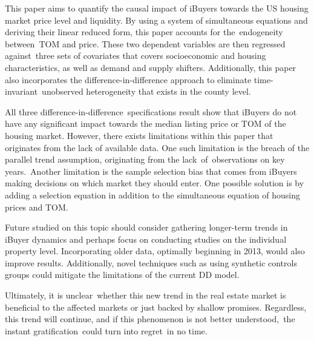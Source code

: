 This paper aims to quantify the causal impact of iBuyers towards the US housing market price level and liquidity. By using a system of simultaneous equations and deriving their linear reduced form, this paper accounts for the endogeneity between TOM and price. These two dependent variables are then regressed against three sets of covariates that covers socioeconomic and housing characteristics, as well as demand and supply shifters. Additionally, this paper also incorporates the difference-in-difference approach to eliminate time-invariant unobserved heterogeneity that exists in the county level.  

All three difference-in-difference specifications result show that iBuyers do not have any significant impact towards the median listing price or TOM of the housing market. However, there exists limitations within this paper that originates from the lack of available data. One such limitation is the breach of the parallel trend assumption, originating from the lack of observations on key years. Another limitation is the sample selection bias that comes from iBuyers making decisions on which market they should enter. One possible solution is by adding a selection equation in addition to the simultaneous equation of housing prices and TOM.  

Future studied on this topic should consider gathering longer-term trends in iBuyer dynamics and perhaps focus on conducting studies on the individual property level. Incorporating older data, optimally beginning in 2013, would also improve results. Additionally, novel techniques such as using synthetic controls groups could mitigate the limitations of the current DD model.  

Ultimately, it is unclear whether this new trend in the real estate market is beneficial to the affected markets or just backed by shallow promises. Regardless, this trend will continue, and if this phenomenon is not better understood, the instant gratification could turn into regret in no time. 
